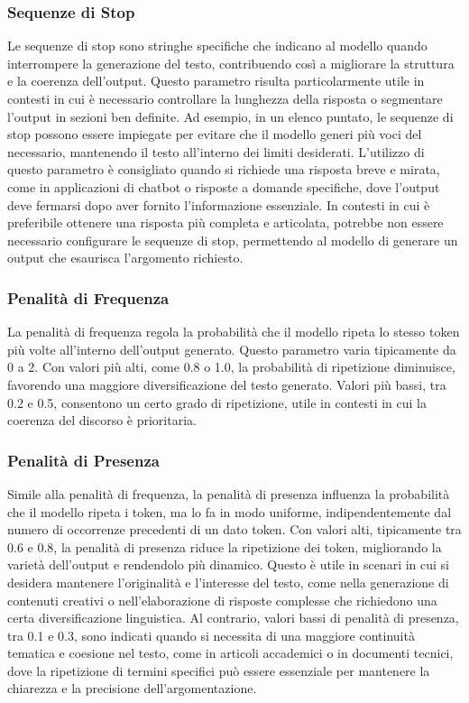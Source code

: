 \documentclass[target=mst,aauheader=,style=]{thud}
\begin{document}
\subsubsection{Sequenze di Stop}
Le sequenze di stop sono stringhe specifiche che indicano al modello quando interrompere la generazione del testo, contribuendo così a migliorare la struttura e la coerenza dell’output. Questo parametro risulta particolarmente utile in contesti in cui è necessario controllare la lunghezza della risposta o segmentare l’output in sezioni ben definite. Ad esempio, in un elenco puntato, le sequenze di stop possono essere impiegate per evitare che il modello generi più voci del necessario, mantenendo il testo all’interno dei limiti desiderati. L’utilizzo di questo parametro è consigliato quando si richiede una risposta breve e mirata, come in applicazioni di chatbot o risposte a domande specifiche, dove l'output deve fermarsi dopo aver fornito l'informazione essenziale. In contesti in cui è preferibile ottenere una risposta più completa e articolata, potrebbe non essere necessario configurare le sequenze di stop, permettendo al modello di generare un output che esaurisca l’argomento richiesto.

\subsubsection{Penalità di Frequenza}
La penalità di frequenza regola la probabilità che il modello ripeta lo stesso token più volte all’interno dell’output generato. Questo parametro varia tipicamente da 0 a 2. Con valori più alti, come 0.8 o 1.0, la probabilità di ripetizione diminuisce, favorendo una maggiore diversificazione del testo generato. Valori più bassi, tra 0.2 e 0.5, consentono un certo grado di ripetizione, utile in contesti in cui la coerenza del discorso è prioritaria.

\subsubsection{Penalità di Presenza}
Simile alla penalità di frequenza, la penalità di presenza influenza la probabilità che il modello ripeta i token, ma lo fa in modo uniforme, indipendentemente dal numero di occorrenze precedenti di un dato token. Con valori alti, tipicamente tra 0.6 e 0.8, la penalità di presenza riduce la ripetizione dei token, migliorando la varietà dell’output e rendendolo più dinamico. Questo è utile in scenari in cui si desidera mantenere l’originalità e l’interesse del testo, come nella generazione di contenuti creativi o nell’elaborazione di risposte complesse che richiedono una certa diversificazione linguistica.
Al contrario, valori bassi di penalità di presenza, tra 0.1 e 0.3, sono indicati quando si necessita di una maggiore continuità tematica e coesione nel testo, come in articoli accademici o in documenti tecnici, dove la ripetizione di termini specifici può essere essenziale per mantenere la chiarezza e la precisione dell’argomentazione. 
\end{document}
